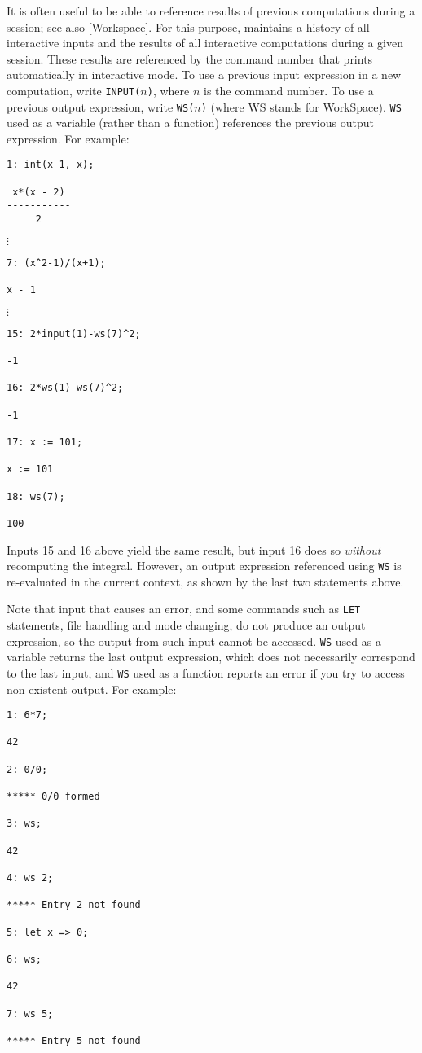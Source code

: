 \hypertarget{reserved:INPUT}{}
\hypertarget{reserved:WS}{}
It is often useful to be able to reference results of previous
computations during a {\REDUCE} session; see also \ref{Workspace}.
For this purpose, {\REDUCE} maintains a history of all
interactive inputs and the results of all interactive computations
during a given session.  These results are referenced by the command
number that {\REDUCE} prints automatically in interactive mode.  To
use a previous input expression in a new computation, write
\texttt{INPUT(}$n$\texttt{)}, where $n$ is the command
number.  To use a previous output expression, write
\texttt{WS(}$n$\texttt{)} (where WS stands for WorkSpace).
\texttt{WS} used as a variable (rather than a function) references the
previous output expression.  For example:
\begin{verbatim}
1: int(x-1, x);

 x*(x - 2)
-----------
     2
\end{verbatim}
\(\vdots\)
\begin{verbatim}
7: (x^2-1)/(x+1);

x - 1
\end{verbatim}
\(\vdots\)
\begin{verbatim}
15: 2*input(1)-ws(7)^2;

-1

16: 2*ws(1)-ws(7)^2;

-1

17: x := 101;

x := 101

18: ws(7);

100
\end{verbatim}
Inputs 15 and 16 above yield the same result, but input 16 does so
\emph{without} recomputing the integral.  However, an output
expression referenced using \texttt{WS} is re-evaluated in the current
context, as shown by the last two statements above.

Note that input that causes an error, and some commands such as
\texttt{LET} statements, file handling and mode changing, do not
produce an output expression, so the output from such input cannot be
accessed.  \texttt{WS} used as a variable returns the last output
expression, which does not necessarily correspond to the last input,
and \texttt{WS} used as a function reports an error if you try to
access non-existent output.  For example:
\begin{verbatim}
1: 6*7;

42

2: 0/0;

***** 0/0 formed

3: ws;

42

4: ws 2;

***** Entry 2 not found

5: let x => 0;

6: ws;

42

7: ws 5;

***** Entry 5 not found
\end{verbatim}

